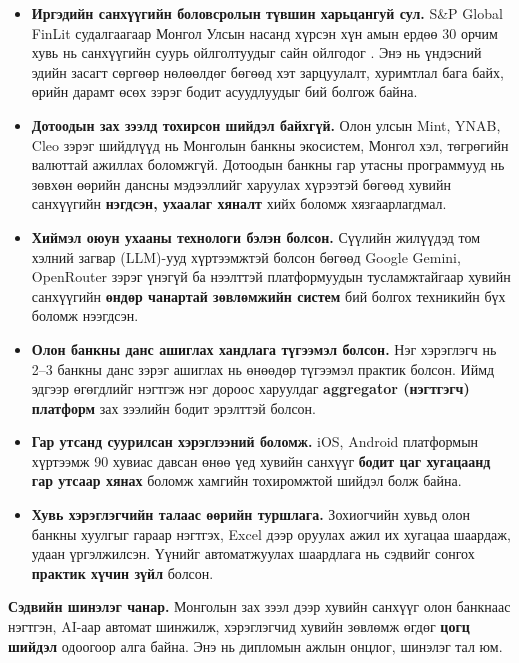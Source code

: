 \begin{itemize}
    \item [\textbf{1.}] \textbf{Иргэдийн санхүүгийн боловсролын түвшин харьцангуй сул.} S\&P Global FinLit судалгаагаар Монгол Улсын насанд хүрсэн хүн амын ердөө 30 орчим хувь нь санхүүгийн суурь ойлголтуудыг сайн ойлгодог \cite{mn_finlit_survey}. Энэ нь үндэсний эдийн засагт сөргөөр нөлөөлдөг бөгөөд хэт зарцуулалт, хуримтлал бага байх, өрийн дарамт өсөх зэрэг бодит асуудлуудыг бий болгож байна.

    \item [\textbf{2.}] \textbf{Дотоодын зах зээлд тохирсон шийдэл байхгүй.} Олон улсын Mint, YNAB, Cleo зэрэг шийдлүүд нь Монголын банкны экосистем, Монгол хэл, төгрөгийн валюттай ажиллах боломжгүй. Дотоодын банкны гар утасны программууд нь зөвхөн өөрийн дансны мэдээллийг харуулах хүрээтэй бөгөөд хувийн санхүүгийн \textbf{нэгдсэн, ухаалаг хяналт} хийх боломж хязгаарлагдмал.

    \item [\textbf{3.}] \textbf{Хиймэл оюун ухааны технологи бэлэн болсон.} Сүүлийн жилүүдэд том хэлний загвар (LLM)-ууд хүртээмжтэй болсон бөгөөд Google Gemini, OpenRouter зэрэг үнэгүй ба нээлттэй платформуудын тусламжтайгаар хувийн санхүүгийн \textbf{өндөр чанартай зөвлөмжийн систем} бий болгох техникийн бүх боломж нээгдсэн.

    \item [\textbf{4.}] \textbf{Олон банкны данс ашиглах хандлага түгээмэл болсон.} Нэг хэрэглэгч нь 2--3 банкны данс зэрэг ашиглах нь өнөөдөр түгээмэл практик болсон. Иймд эдгээр өгөгдлийг нэгтгэж нэг дороос харуулдаг \textbf{aggregator (нэгтгэгч) платформ} зах зээлийн бодит эрэлттэй болсон.

    \item [\textbf{5.}] \textbf{Гар утсанд суурилсан хэрэглээний боломж.} iOS, Android платформын хүртээмж 90 хувиас давсан өнөө үед хувийн санхүүг \textbf{бодит цаг хугацаанд гар утсаар хянах} боломж хамгийн тохиромжтой шийдэл болж байна.

    \item [\textbf{6.}] \textbf{Хувь хэрэглэгчийн талаас өөрийн туршлага.} Зохиогчийн хувьд олон банкны хуулгыг гараар нэгтгэх, Excel дээр оруулах ажил их хугацаа шаардаж, удаан үргэлжилсэн. Үүнийг автоматжуулах шаардлага нь сэдвийг сонгох \textbf{практик хүчин зүйл} болсон.
\end{itemize}

\textbf{Сэдвийн шинэлэг чанар.} Монголын зах зээл дээр хувийн санхүүг олон банкнаас нэгтгэн, AI-аар автомат шинжилж, хэрэглэгчид хувийн зөвлөмж өгдөг \textbf{цогц шийдэл} одоогоор алга байна. Энэ нь дипломын ажлын онцлог, шинэлэг тал юм.

